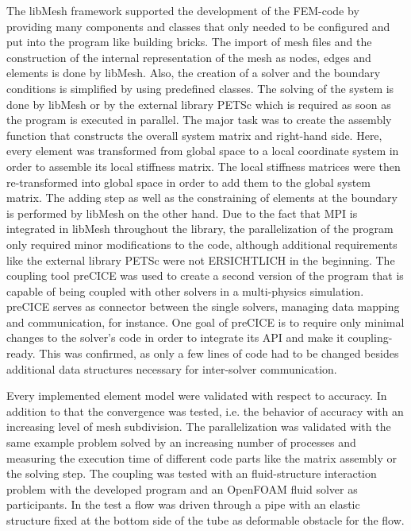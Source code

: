   The libMesh framework supported the development of the FEM-code by providing many components and classes that only needed to be configured and put into the program like building bricks. The import of mesh files and the construction of the internal representation of the mesh as nodes, edges and elements is done by libMesh. Also, the creation of a solver and the boundary conditions is simplified by using predefined classes. The solving of the system is done by libMesh or by the external library PETSc which is required as soon as the program is executed in parallel. The major task was to create the assembly function that constructs the overall system matrix and right-hand side. Here, every element was transformed from global space to a local coordinate system in order to assemble its local stiffness matrix. The local stiffness matrices were then re-transformed into global space in order to add them to the global system matrix. The adding step as well as the constraining of elements at the boundary is performed by libMesh on the other hand. Due to the fact that MPI is integrated in libMesh throughout the library, the parallelization of the program only required minor modifications to the code, although additional requirements like the external library PETSc were not ERSICHTLICH in the beginning. %
  The coupling tool preCICE was used to create a second version of the program that is capable of being coupled with other solvers in a multi-physics simulation. preCICE serves as connector between the single solvers, managing data mapping and communication, for instance. One goal of preCICE is to require only minimal changes to the solver's code in order to integrate its API and make it coupling-ready. This was confirmed, as only a few lines of code had to be changed besides additional data structures necessary for inter-solver communication.

  Every implemented element model were validated with respect to accuracy. In addition to that the convergence was tested, i.e. the behavior of accuracy with an increasing level of mesh subdivision. The parallelization was validated with the same example problem solved by an increasing number of processes and measuring the execution time of different code parts like the matrix assembly or the solving step. The coupling was tested with an fluid-structure interaction problem with the developed program and an OpenFOAM fluid solver as participants. In the test a flow was driven through a pipe with an elastic structure fixed at the bottom side of the tube as deformable obstacle for the flow.
 
